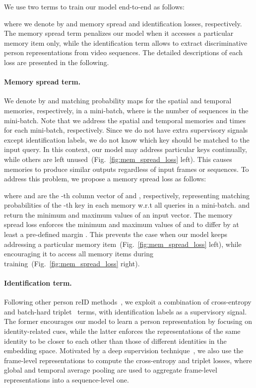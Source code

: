 \documentclass[10pt,twocolumn,letterpaper]{article}
\begin{document}
		We use two terms to train our model end-to-end as follows:
			
		where we denote by  and  memory spread and identification losses, respectively. The memory spread term penalizes our model when it accesses a particular memory item only, while the identification term allows to extract discriminative person representations from video sequences. The detailed descriptions of each loss are presented in the following.
		
		\vspace{-0.4cm}
		\paragraph{Memory spread term.}
		
			We denote by  and  matching probability maps for the spatial and temporal memories, respectively, in a mini-batch, where  is the number of sequences in the mini-batch. Note that we address the spatial and temporal memories  and  times for each mini-batch, respectively. Since we do not have extra supervisory signals except identification labels, we do not know which key should be matched to the input query. In this context, our model may address particular keys continually, while others are left unused~(Fig.~\ref{fig:mem_spread_loss} left). This causes memories to produce similar outputs regardless of input frames or sequences. To address this problem, we propose a memory spread loss as follows:
					
			where  and  are the -th column vector of  and , respectively, representing matching probabilities of the -th key in each memory w.r.t all queries in a mini-batch.  and  return the minimum and maximum values of an input vector. The memory spread loss enforces the minimum and maximum values of  and  to differ by at least a pre-defined margin . This prevents the case when our model keeps addressing a particular memory item~(Fig.~\ref{fig:mem_spread_loss} left), while encouraging it to access all memory items during training~(Fig.~\ref{fig:mem_spread_loss} right).
		
		\vspace{-0.4cm}
		\paragraph{Identification term.}
		
			Following other person reID methods~\cite{yan2020learning,zhang2020multi,hou2020temporal,chentemporal}, we exploit a combination of cross-entropy and batch-hard triplet~\cite{hermans2017defense} terms, with identification labels as a supervisory signal. The former encourages our model to learn a person representation  by focusing on identity-related cues, while the latter enforces the representations of the same identity to be closer to each other than those of different identities in the embedding space. Motivated by a deep supervision technique~\cite{lee2015deeply,wang2015training}, we also use the frame-level representations  to compute the cross-entropy and triplet losses, where global and temporal average pooling are used to aggregate frame-level representations into a sequence-level one.
			
\end{document}
